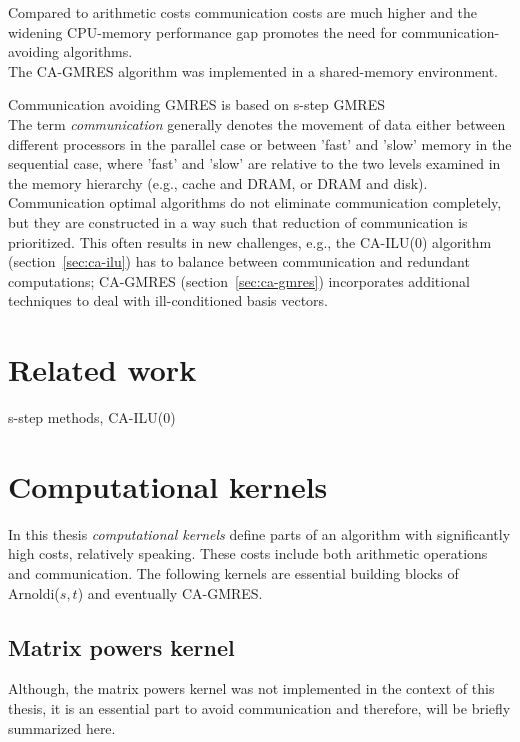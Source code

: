 \documentclass{scrartcl}
\begin{document}
Compared to arithmetic costs communication costs are much higher and the widening CPU-memory performance gap promotes the need for communication-avoiding algorithms.\\

The CA-GMRES algorithm was implemented in a shared-memory environment.

Communication avoiding GMRES is based on s-step GMRES 
\cite{Erhel95aparallel}
\\

The term \textit{communication} generally denotes the movement of data either between different processors in the parallel case or between 'fast' and 'slow' memory in the sequential case, where 'fast' and 'slow' are relative to the two levels examined in the memory hierarchy (e.g., cache and DRAM, or DRAM and disk). Communication optimal algorithms do not eliminate communication completely, but they are constructed in a way such that reduction of communication is prioritized. This often results in new challenges, e.g., the  CA-ILU(0) algorithm (section~\ref{sec:ca-ilu}) has to balance between communication and redundant computations; CA-GMRES (section~\ref{sec:ca-gmres}) incorporates additional techniques to deal with ill-conditioned basis vectors.

\section{Related work}
s-step methods, CA-ILU(0)

\section{Computational kernels}
In this thesis \textit{computational kernels} define parts of an algorithm with significantly high costs, relatively speaking. These costs include both arithmetic operations and communication. The following kernels are essential building blocks of Arnoldi($s,t$) and eventually CA-GMRES.


\subsection{Matrix powers kernel}
Although, the matrix powers kernel was not implemented in the context of this thesis, it is an essential part to avoid communication and therefore, will be briefly summarized here.\\
\end{document}
